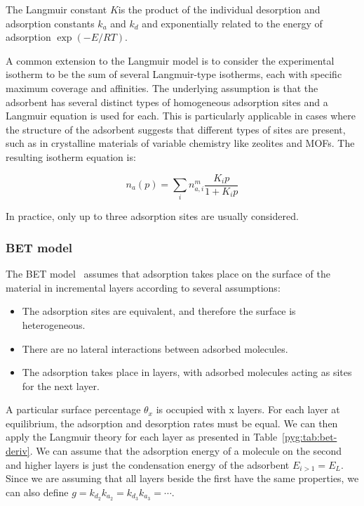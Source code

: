 The Langmuir constant \(K\)is the product of the individual
desorption
and adsorption constants \(k_a\) and \(k_d\) and exponentially
related to the energy of adsorption \(\exp{(-{E}/{RT})}\).

A common extension to the Langmuir model is to consider
the experimental isotherm to be the sum of several Langmuir-type
isotherms, each with specific maximum coverage and affinities.
The underlying assumption is that the adsorbent has several distinct
types of homogeneous adsorption sites and a Langmuir
equation is used for each. This is particularly
applicable in cases where the structure of the adsorbent
suggests that different types of sites are present,
such as in crystalline materials of variable chemistry like
zeolites and MOFs. The resulting isotherm equation is:

\begin{equation}\label{pyg:eqn:langmulti}
	n_a(p) = \sum_i n_{a,i}^m\frac{K_i p}{1+K_i p}
\end{equation}

In practice, only up to three adsorption sites are usually
considered.

\subsubsection{BET model}\label{pyg:models:bet}

The BET model~\cite{brunauerAdsorptionGasesMultimolecular1938}
assumes that adsorption takes place on the surface of the material in
incremental layers according to several assumptions:

\begin{itemize}
	\item The adsorption sites are equivalent, and therefore the
	      surface is heterogeneous.
	\item There are no lateral interactions between adsorbed
	      molecules.
	\item The adsorption takes place in layers, with adsorbed
	      molecules
	      acting as sites for the next layer.
\end{itemize}

A particular surface percentage \(\theta_x\) is occupied with
x layers. For each layer at equilibrium, the adsorption and
desorption rates must be equal.
We can then apply the Langmuir theory for each layer
as presented in Table~\autoref{pyg:tab:bet-deriv}. We can
assume that the adsorption energy of a molecule on the second
and higher layers is just the condensation energy of the
adsorbent \(E_{i>1} = E_L\). Since we are assuming that
all layers beside the first have the same properties,
we can also define \(g= {k_{d_2}}{k_{a_2}} = {k_{d_3}}{k_{a_3}} =
\cdots\).

